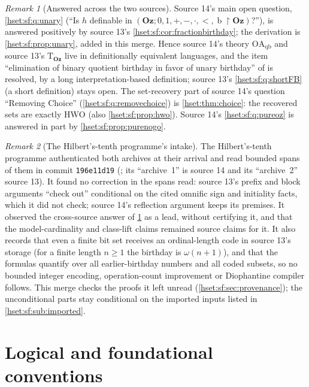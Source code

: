 \documentclass[11pt,letterpaper]{article}
\theoremstyle{definition}
\theoremstyle{remark}
\newtheorem{remark}[remark]{Remark}\aliascntresetthe{remark}
\newcommand{\bd}{\operatorname{b}}
\newcommand{\HWO}{\mathrm{HWO}}
\newcommand{\restr}{\mathbin{\upharpoonright}}
\newcommand{\Oz}{\mathbf{Oz}}
\newcommand{\Tth}{\mathrm{T}}
\newcommand{\OAqb}{\mathrm{OA}_{\mathrm{qb}}}
\begin{document}
\begin{remark}[Answered across the two sources]
\label{hset:sf:rem:answered}
Source 14's main open question, \cref{hset:sf:q:unary} (``Is $h$ definable in
$(\Oz;0,1,+,-,\cdot,<,\bd\restr\Oz)$?''), is answered positively by source 13's
\cref{hset:sf:cor:fractionbirthday}; the derivation is \cref{hset:sf:prop:unary},
added in this merge. Hence source 14's theory $\OAqb$ and source 13's
$\Tth_{\Oz}$ live in definitionally equivalent languages, and the item
``elimination of binary quotient birthday in favor of unary birthday'' of
 is resolved, by a long
interpretation-based definition; source 13's \cref{hset:sf:q:shortFB} (a short
definition) stays open. The set-recovery part of source 14's question ``Removing
Choice'' (\cref{hset:sf:q:removechoice}) is \cref{hset:thm:choice}: the recovered
sets are exactly $\HWO$ (also \cref{hset:sf:prop:hwo}). Source 14's
\cref{hset:sf:q:pureoz} is answered in part by \cref{hset:sf:prop:purenogo}.
\end{remark}

\begin{remark}[The Hilbert's-tenth programme's intake]
\label{hset:sf:rem:h10}
The Hilbert's-tenth programme authenticated both archives at their arrival and
read bounded spans of them in commit \texttt{196e11d19}
(;
its ``archive~1'' is source 14 and its ``archive~2'' source 13). It found no
correction in the spans read: source 13's prefix and block arguments ``check
out'' conditional on the cited omnific sign and initiality facts, which it did
not check; source 14's reflection argument keeps its premises. It observed the
cross-source answer of \cref{hset:sf:rem:answered} as a lead, without certifying
it, and that the model-cardinality and class-lift claims remained source claims
for it. It also records that even a finite bit set receives an ordinal-length
code in source 13's storage (for a finite length $n\ge1$ the birthday is
$\omega(n+1)$), and that the formulas quantify over all earlier-birthday numbers
and all coded subsets, so no bounded integer encoding, operation-count
improvement or Diophantine compiler follows. This merge checks the proofs it left
unread (\cref{hset:sf:sec:provenance}); the unconditional parts stay conditional
on the imported inputs listed in \cref{hset:sf:sub:imported}.
\end{remark}

\section{Logical and foundational conventions}
\label{hset:sf:sec:logic}
\end{document}
